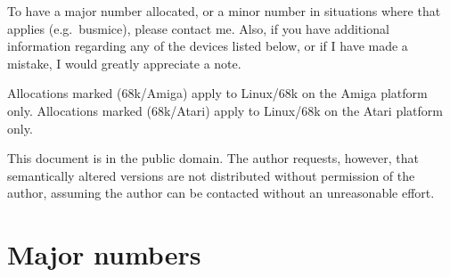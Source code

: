 To have a major number allocated, or a minor number in situations
where that applies (e.g.\ busmice), please contact me.  Also, if you
have additional information regarding any of the devices listed below,
or if I have made a mistake, I would greatly appreciate a note.

Allocations marked (68k/Amiga) apply to Linux/68k on the Amiga
platform only.  Allocations marked (68k/Atari) apply to Linux/68k on
the Atari platform only.

This document is in the public domain.  The author requests, however,
that semantically altered versions are not distributed without
permission of the author, assuming the author can be contacted without
an unreasonable effort.

\section{Major numbers}

